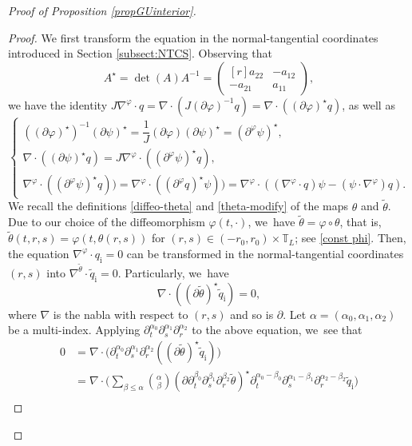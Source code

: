\documentclass[11pt]{article}
\newcommand{\dt}{\partial_t}
\theoremstyle{definition}
\begin{document}
\begin{proof}[Proof of Proposition \ref{propGUinterior}]
\begin{proof}
We first transform the equation in the normal-tangential coordinates introduced in Section \ref{subsect:NTCS}.
Observing that
\[
A^\star = \det(A)A^{-1} =
\begin{pmatrix*}[r]
a_{22} & -a_{12} \\
-a_{21} & a_{11}
\end{pmatrix*},
\]
we have the identity $J\nabla^\varphi\cdot q = \nabla\cdot(J(\partial\varphi)^{-1}q) = \nabla\cdot((\partial\varphi)^\star q)$, as well as
\begin{equation}\label{F4}
\begin{cases}
((\partial\varphi)^\star)^{-1}(\partial\psi)^\star = \dfrac{1}{J}(\partial\varphi)(\partial\psi)^\star = (\partial^\varphi\psi)^\star, \\
\nabla\cdot((\partial\psi)^\star q) = J\nabla^\varphi\cdot((\partial^\varphi\psi)^\star q), \\
\nabla^\varphi\cdot((\partial^\varphi\psi)^\star q)) = \nabla^\varphi\cdot((\partial^\varphi q)^\star \psi))
= \nabla^\varphi\cdot((\nabla^\varphi\cdot q)\psi - (\psi\cdot\nabla^\varphi)q).
\end{cases}
\end{equation}
We recall the definitions \eqref{diffeo-theta} and \eqref{theta-modify} of the maps $\theta$ and $\tilde{\theta}$.
Due to our choice of the diffeomorphism $\varphi(t,\cdot)$, we~have $\tilde{\theta}=\varphi\circ\theta$, that is,
$\tilde{\theta}(t,r,s)=\varphi(t,\theta(r,s))$ for $(r,s)\in(-r_0,r_0)\times\mathbb{T}_L$; see \eqref{const phi}.
Then, the equation $\nabla^\varphi\cdot q_\mathrm{i}=0$ can be transformed in the normal-tangential coordinates $(r,s)$ into
$\nabla^{\tilde{\theta}}\cdot\tilde{q}_\mathrm{i}=0$.
Particularly, we~have
\[
\nabla\cdot((\partial\tilde{\theta})^\star\tilde{q}_\mathrm{i}) = 0,
\]
where $\nabla$ is the nabla with respect to $(r,s)$ and so is $\partial$.
Let $\alpha=(\alpha_0,\alpha_1,\alpha_2)$ be a multi-index.
Applying $\dt^{\alpha_0}\partial_s^{\alpha_1}\partial_r^{\alpha_2}$ to the above equation, we~see that
\begin{align*}
0 &= \nabla\cdot\bigl(\dt^{\alpha_0}\partial_s^{\alpha_1}\partial_r^{\alpha_2}((\partial\tilde{\theta})^\star\tilde{q}_\mathrm{i}) \bigr) \\
&= \nabla\cdot\biggl(\sum_{\beta\leq\alpha} \binom{\alpha}{\beta}
(\partial\dt^{\beta_0}\partial_s^{\beta_1}\partial_r^{\beta_2}\tilde{\theta})^\star
\dt^{\alpha_0-\beta_0}\partial_s^{\alpha_1-\beta_1}\partial_r^{\alpha_2-\beta_2}\tilde{q}_\mathrm{i} \biggr) \\

\end{align*}
\end{proof}
\end{proof}
\end{document}
